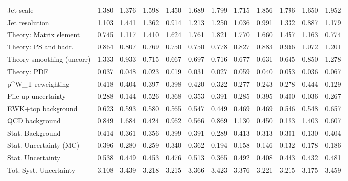 \begin{tabular}{l|p{0.6cm}p{0.6cm}p{0.6cm}p{0.6cm}p{0.6cm}p{0.6cm}p{0.6cm}p{0.6cm}p{0.6cm}p{0.6cm}p{0.6cm}}
Jet scale                                & 1.380 & 1.376 & 1.598 & 1.450 & 1.689 & 1.799 & 1.715 & 1.856 & 1.796 & 1.650 & 1.952 \\
Jet resolution                           & 1.103 & 1.441 & 1.362 & 0.914 & 1.213 & 1.250 & 1.036 & 0.991 & 1.332 & 0.887 & 1.179 \\
Theory: Matrix element                   & 0.745 & 1.117 & 1.410 & 1.624 & 1.761 & 1.821 & 1.770 & 1.660 & 1.457 & 1.163 & 0.774 \\
Theory: PS and hadr.                     & 0.864 & 0.807 & 0.769 & 0.750 & 0.750 & 0.778 & 0.827 & 0.883 & 0.966 & 1.072 & 1.201 \\
Theory smoothing (uncorr)                & 1.333 & 0.933 & 0.715 & 0.667 & 0.697 & 0.716 & 0.677 & 0.631 & 0.645 & 0.850 & 1.278 \\
Theory: PDF                              & 0.037 & 0.048 & 0.023 & 0.019 & 0.031 & 0.027 & 0.059 & 0.040 & 0.053 & 0.036 & 0.067 \\
p^{W}_{T} reweighting                    & 0.418 & 0.404 & 0.397 & 0.398 & 0.420 & 0.322 & 0.277 & 0.243 & 0.278 & 0.444 & 0.129 \\
Pile-up uncertainty                      & 0.288 & 0.144 & 0.526 & 0.368 & 0.353 & 0.391 & 0.285 & 0.395 & 0.400 & 0.036 & 0.267 \\
EWK+top background                       & 0.623 & 0.593 & 0.580 & 0.565 & 0.547 & 0.449 & 0.469 & 0.469 & 0.546 & 0.548 & 0.657 \\
QCD background                           & 0.849 & 1.684 & 0.424 & 0.962 & 0.566 & 0.869 & 1.130 & 0.450 & 0.183 & 1.403 & 0.607 \\
Stat. Background                         & 0.414 & 0.361 & 0.356 & 0.399 & 0.391 & 0.289 & 0.413 & 0.313 & 0.301 & 0.130 & 0.404 \\
Stat. Uncertainty (MC)                   & 0.396 & 0.280 & 0.259 & 0.340 & 0.362 & 0.194 & 0.158 & 0.146 & 0.132 & 0.178 & 0.186 \\
\hline
Stat. Uncertainty                        & 0.538 & 0.449 & 0.453 & 0.476 & 0.513 & 0.365 & 0.492 & 0.408 & 0.443 & 0.432 & 0.481 \\
\hline
Tot. Syst. Uncertainty                   & 3.108 & 3.439 & 3.218 & 3.215 & 3.366 & 3.423 & 3.376 & 3.221 & 3.215 & 3.175 & 3.459 \\
\hline
\end{tabular}
